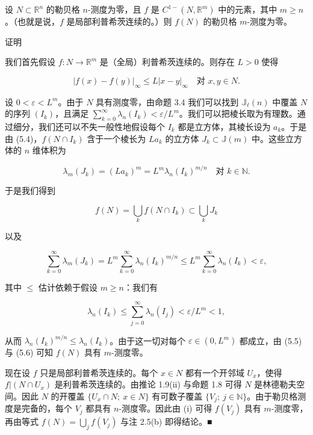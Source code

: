 \begin{theorem}

设 $ N \subset \mathbb{R}^n $ 的勒贝格 $ n $-测度为零，且 $ f $ 是 $ C^{1-}(N, \mathbb{R}^m) $ 中的元素，其中 $ m \ge n $。（也就是说，$ f $ 是局部利普希茨连续的。）则 $ f(N) $ 的勒贝格 $ m $-测度为零。

证明

\begin{subitems}
\item

我们首先假设 $ f: N \to \mathbb{R}^m $ 是（全局）利普希茨连续的。则存在 $ L > 0 $ 使得

\begin{equation}
|f(x) - f(y)|_{\infty} \le L|x - y|_{\infty} \quad \text{对 } x, y \in N .\tag{5.4}
\end{equation}

设 $ 0 < \varepsilon < L^m $。由于 $ N $ 具有测度零，由命题 3.4 我们可以找到 $ \mathbb{J}_{\ell}(n) $ 中覆盖 $ N $ 的序列 $ (I_k) $，且满足 $ \sum_{k=0}^{\infty} \lambda_n(I_k) < \varepsilon/L^m $。我们可以把棱长取为有理数。通过细分，我们还可以不失一般性地假设每个 $ I_k $ 都是立方体，其棱长设为 $ a_k $。于是由 (5.4)，$ f(N \cap I_k) $ 含于一个棱长为 $ La_k $ 的立方体 $ J_k \subset \mathbb{J}(m) $ 中。这些立方体的 $ n $ 维体积为

\[
\lambda_m(J_k) = (La_k)^m = L^m \lambda_n(I_k)^{m/n} \quad \text{对 } k \in \mathbb{N} .
\]

于是我们得到

\begin{equation}
f(N) = \bigcup_k f(N \cap I_k) \subset \bigcup_k J_k\tag{5.5}
\end{equation}

以及

\begin{equation}
\sum_{k=0}^{\infty} \lambda_m(J_k) = L^m \sum_{k=0}^{\infty} \lambda_n(I_k)^{m/n} \le L^m \sum_{k=0}^{\infty} \lambda_n(I_k) < \varepsilon ,\tag{5.6}
\end{equation}

其中 $ \le $ 估计依赖于假设 $ m \ge n $：我们有

\[
\lambda_n(I_k) \le \sum_{j=0}^{\infty} \lambda_n(I_j) < \varepsilon/L^m < 1 ,
\]

从而 $ \lambda_n(I_k)^{m/n} \le \lambda_n(I_k) $。由于这一切对每个 $ \varepsilon \in (0, L^m) $ 都成立，由 (5.5) 与 (5.6) 可知 $ f(N) $ 具有 $ m $-测度零。

\item

现在设 $ f $ 只是局部利普希茨连续的。每个 $ x \in N $ 都有一个开邻域 $ U_x $，使得 $ f|(N \cap U_x) $ 是利普希茨连续的。由推论 1.9(ii) 与命题 1.8 可得 $ N $ 是林德勒夫空间。因此 $ N $ 的开覆盖 $ \{ U_x \cap N ; \ x \in N \} $ 有可数子覆盖 $ \{ V_j ; \ j \in \mathbb{N} \} $。由于勒贝格测度是完备的，每个 $ V_j $ 都具有 $ n $-测度零。因此由 (i) 可得 $ f(V_j) $ 具有 $ m $-测度零，再由等式 $ f(N) = \bigcup_j f(V_j) $ 与注 2.5(b) 即得结论。\nobreak\hspace{0.35em}■

\end{subitems}

\end{theorem}

